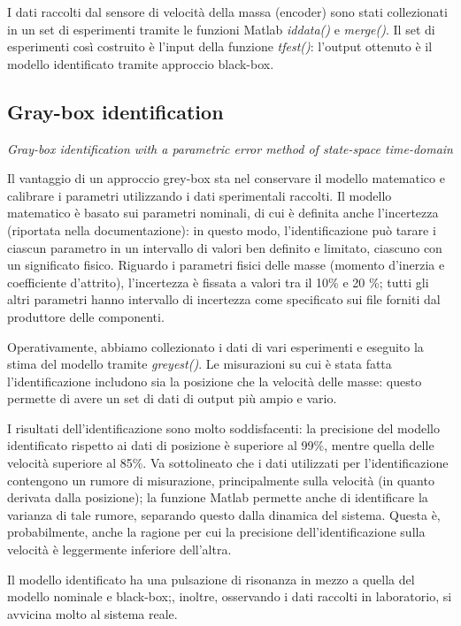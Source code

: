 I dati raccolti dal sensore di velocità della massa (encoder) sono stati collezionati in un set di esperimenti tramite le funzioni Matlab \textit{iddata()} e \textit{merge()}. Il set di esperimenti così costruito è l'input della funzione \textit{tfest()}: l'output ottenuto è il modello identificato tramite approccio black-box.

\subsection{Gray-box identification}

\textit{Gray-box identification with a parametric error method of state-space time-domain}
\\ \par Il vantaggio di un approccio grey-box sta nel conservare il modello matematico e calibrare i parametri utilizzando i dati sperimentali raccolti. Il modello matematico è basato sui parametri nominali, di cui è definita anche l'incertezza (riportata nella documentazione): in questo modo, l'identificazione può tarare i ciascun parametro in un intervallo di valori ben definito e limitato, ciascuno con un significato fisico. Riguardo i parametri fisici delle masse (momento d'inerzia e coefficiente d'attrito), l'incertezza è fissata a valori tra il 10\% e 20 \%; tutti gli altri parametri hanno intervallo di incertezza come specificato sui file forniti dal produttore delle componenti.

Operativamente, abbiamo collezionato i dati di vari esperimenti e eseguito la stima del modello tramite \textit{greyest()}. Le misurazioni su cui è stata fatta l'identificazione includono sia la posizione che la velocità delle masse: questo permette di avere un set di dati di output più ampio e vario.

I risultati dell'identificazione sono molto soddisfacenti: la precisione del modello identificato rispetto ai dati di posizione è superiore al 99\%, mentre quella delle velocità superiore al 85\%. Va sottolineato che i dati utilizzati per l'identificazione contengono un rumore di misurazione, principalmente sulla velocità (in quanto derivata dalla posizione); la funzione Matlab permette anche di identificare la varianza di tale rumore, separando questo dalla dinamica del sistema. Questa è, probabilmente, anche la ragione per cui la precisione dell'identificazione sulla velocità è leggermente inferiore dell'altra.

Il modello identificato ha una pulsazione di risonanza in mezzo a quella del modello nominale e black-box;, inoltre, osservando i dati raccolti in laboratorio, si avvicina molto al sistema reale.

